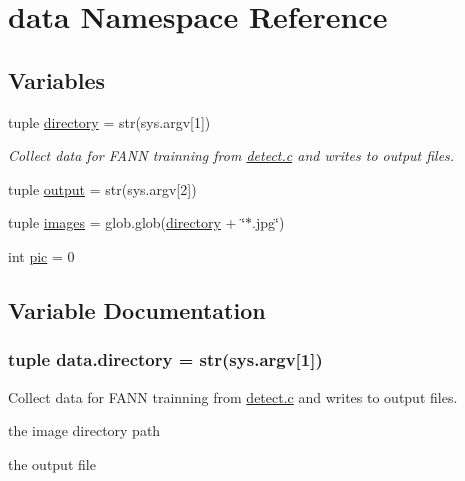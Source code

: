 \hypertarget{namespacedata}{}\section{data Namespace Reference}
\label{namespacedata}
\subsection*{Variables}
\begin{DoxyCompactItemize}
\item 
tuple \hyperlink{namespacedata_a7e780b6ab75952872b835c5262833431}{directory} = str(sys.\+argv\mbox{[}1\mbox{]})
\begin{DoxyCompactList}\small\item\em Collect data for F\+A\+N\+N trainning from \hyperlink{detect_8c}{detect.\+c} and writes to output files. \end{DoxyCompactList}\item 
tuple \hyperlink{namespacedata_a7db2d5f10640a9611ccd6ed7d7d441bf}{output} = str(sys.\+argv\mbox{[}2\mbox{]})
\item 
tuple \hyperlink{namespacedata_afad7d0c44155fd378ffa57d79db01581}{images} = glob.\+glob(\hyperlink{namespacedata_a7e780b6ab75952872b835c5262833431}{directory} + \char`\"{}$\ast$.jpg\char`\"{})
\item 
int \hyperlink{namespacedata_ab8681af0efc43b633fc4015ff584af4e}{pic} = 0
\end{DoxyCompactItemize}


\subsection{Variable Documentation}
\hypertarget{namespacedata_a7e780b6ab75952872b835c5262833431}{}
\subsubsection[{directory}]{\setlength{\rightskip}{0pt plus 5cm}tuple data.\+directory = str(sys.\+argv\mbox{[}1\mbox{]})}\label{namespacedata_a7e780b6ab75952872b835c5262833431}


Collect data for F\+A\+N\+N trainning from \hyperlink{detect_8c}{detect.\+c} and writes to output files. 

\begin{DoxyItemize}
\item the image directory path \item the output file \end{DoxyItemize}
\hypertarget{namespacedata_afad7d0c44155fd378ffa57d79db01581}{}
